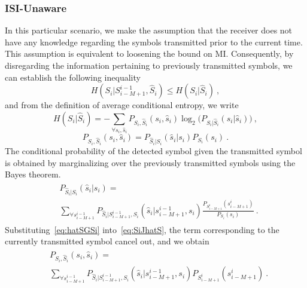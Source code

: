 \documentclass[journal]{IEEEtranTCOM}
\begin{document}
\subsubsection{ISI-Unaware}\label{sec:2.1.2}
In this particular scenario, we make the assumption that the receiver does not have any knowledge regarding the symbols transmitted prior to the current time. This assumption is equivalent to loosening the bound on MI. Consequently, by disregarding the information pertaining to previously transmitted symbols, we can establish the following inequality
\begin{equation}
    H(S_{i}|S_{i-M+1}^{i-1},\hat{S}_{i})\leq  H(S_{i}|\hat{S}_{i})~,\label{eq:ISIA<ISIU}
\end{equation}
and from the definition of average conditional entropy, we write
\begin{equation}
    H(S_{i}|\hat{S}_{i}) = -\sum_{\forall s_{i},\hat{s}_{i}}P_{S_{i},\hat{S}_{i}}({s_{i},\hat{s}_{i}})\log_{2}\big(P_{S_{i}|\hat{S}_{i}}({s_{i}|\hat{s}_{i}})\big)~,
\end{equation}
\begin{equation}
    P_{S_{i},\hat{S}_{i}}(s_{i},\hat{s}_{i}) = P_{\hat{S}_{i}|S_{i}}(\hat{s}_{i}|s_{i})P_{S_{i}}(s_{i})~.\label{eq:SiJhatS}
\end{equation}
The conditional probability of the detected symbol given the transmitted symbol is obtained by marginalizing over the previously transmitted symbols using the  Bayes theorem. 
\begin{align}
    \begin{split}
    &P_{\hat{S}_{i}|S_{i}}(\hat{s}_{i}|s_{i}) =\\& \sum_{\forall s^{i-1}_{i-M+1}}P_{\hat{S}_{i}|S^{i-1}_{i-M+1},S_{i}}(\hat{s}_{i}|s^{i-1}_{i-M+1},s_{i})\frac{P_{S_{i-M+1}^{i}}(s_{i-M+1}^{i})}{P_{S_{i}}(s_{i})}~.\label{eq:hatSGSi}
\end{split}
\end{align}
Substituting~\eqref{eq:hatSGSi} into~\eqref{eq:SiJhatS}, the term corresponding to the currently transmitted symbol cancel out, and we obtain
\begin{align}
    \begin{split}
    &P_{S_{i},\hat{S}_{i}}(s_{i},\hat{s}_{i}) =\\& \sum_{\forall s^{i-1}_{i-M+1}}P_{\hat{S}_{i}|S^{i-1}_{i-M+1},S_{i}}(\hat{s}_{i}|s^{i-1}_{i-M+1},s_{i})P_{S_{i-M+1}^{i}}(s_{i-M+1}^{i})~.
\end{split}
\end{align}
\end{document}
